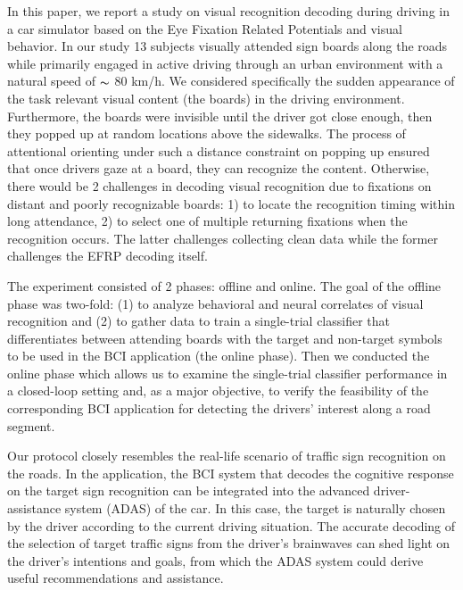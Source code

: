 \documentclass[12pt]{iopart}
\begin{document}
In this paper, we report a study on visual recognition decoding during driving
in a car simulator based on the Eye Fixation Related
Potentials and visual behavior. 
In our study 13 subjects visually attended sign boards along the roads
while primarily engaged in active driving through
an urban environment with a natural speed of $\thicksim$ 80 km/h. 
We considered specifically the sudden appearance of the task relevant visual content (the boards) in the driving environment.
Furthermore, the boards were invisible until the driver got close enough,
then they popped up at random locations above the sidewalks.
The process of attentional orienting under such a distance constraint on popping up ensured 
that once drivers gaze at a board, they can recognize the content.
Otherwise, there would be 2 challenges in decoding
visual recognition due to fixations on distant
and poorly recognizable boards:
1) to locate the recognition timing within long attendance,
2) to select one of multiple returning fixations when the recognition occurs.
The latter challenges collecting clean data while the former challenges
the EFRP decoding itself.

The experiment consisted of 2 phases: offline and online.
The goal of the offline phase was two-fold: (1) to analyze behavioral
and neural correlates of visual recognition and (2) to gather data to train a single-trial classifier that differentiates between attending boards with the target and non-target symbols to be used in the BCI application (the online phase).
Then we conducted the online phase which allows us to examine the single-trial classifier performance in a closed-loop setting and, as a major objective, to verify the feasibility of the corresponding BCI application for detecting the drivers' interest along a road segment.

Our protocol closely resembles the real-life scenario of traffic sign
recognition on the roads. In the application, 
the BCI system that decodes the cognitive response on the target sign
recognition can be integrated into the advanced driver-assistance system
(ADAS) of the car.
In this case, the target is naturally chosen by the driver
according to the current driving situation. 
The accurate decoding of the selection of target traffic signs 
from the driver’s brainwaves can shed light on the driver’s intentions
and goals, from which the ADAS system could derive useful 
recommendations and assistance.

\end{document}
